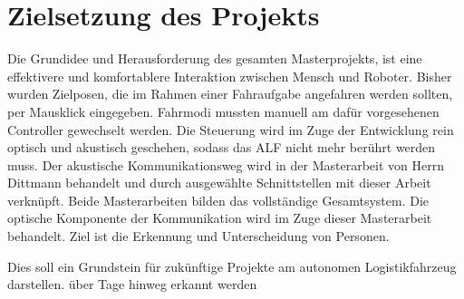	\section{Zielsetzung des Projekts}
	\label{sec: Zielsetzung}
		Die Grundidee und Herausforderung des gesamten Masterprojekts, ist eine effektivere und komfortablere Interaktion zwischen Mensch und Roboter. Bisher wurden Zielposen, die im Rahmen einer Fahraufgabe angefahren werden sollten, per Mausklick eingegeben. Fahrmodi mussten manuell am dafür vorgesehenen Controller gewechselt werden. Die Steuerung wird im Zuge der Entwicklung rein optisch und akustisch geschehen, sodass das ALF nicht mehr berührt werden muss. Der akustische Kommunikationsweg wird in der Masterarbeit von Herrn Dittmann behandelt und durch ausgewählte Schnittstellen mit dieser Arbeit verknüpft. Beide Masterarbeiten bilden das vollständige Gesamtsystem. Die optische Komponente der Kommunikation wird im Zuge dieser Masterarbeit behandelt. Ziel ist die Erkennung und Unterscheidung von Personen.
		
		 Dies soll ein Grundstein für zukünftige Projekte am autonomen Logistikfahrzeug darstellen. über Tage hinweg erkannt werden\\
		
		
	